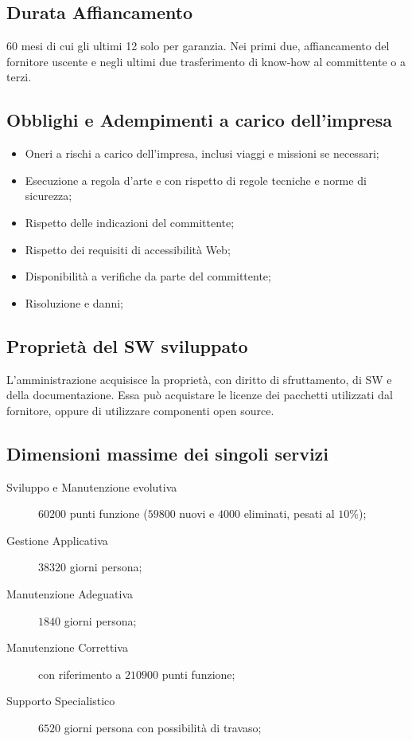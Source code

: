 \documentclass{article}
\begin{document}
\subsection{Durata Affiancamento}\label{sub:durata_affiancamento} %
60 mesi di cui gli ultimi 12 solo per garanzia.
Nei primi due, affiancamento del fornitore uscente e negli ultimi due trasferimento di know-how al committente o a terzi.
%
\subsection{Obblighi e Adempimenti a carico dell'impresa}\label{sub:obblighi_e_adempimenti_a_carico_dell_impresa} %
\begin{itemize}
    \item Oneri a rischi a carico dell'impresa, inclusi viaggi e missioni se necessari;
    \item Esecuzione a regola d'arte e con rispetto di regole tecniche e norme di sicurezza;
    \item Rispetto delle indicazioni del committente;
    \item Rispetto dei requisiti di accessibilità Web;
    \item Disponibilità a verifiche da parte del committente;
    \item Risoluzione e danni;
\end{itemize}
%
\subsection{Proprietà del SW sviluppato}\label{sub:propriet_del_sw_sviluppato} %
L'amministrazione acquisisce la proprietà, con diritto di sfruttamento, di SW e della documentazione.
Essa può acquistare le licenze dei pacchetti utilizzati dal fornitore, oppure di utilizzare componenti open source.
%
\subsection{Dimensioni massime dei singoli servizi}\label{sub:dimensioni_massime_dei_singoli_servizi} %
\begin{description}
    \item[Sviluppo e Manutenzione evolutiva] $60200$ punti funzione ($59800$ nuovi e $4000$ eliminati, pesati al $10\%$);
    \item[Gestione Applicativa] $38320$ giorni persona;
    \item[Manutenzione Adeguativa] $1840$ giorni persona;
    \item[Manutenzione Correttiva] con riferimento a $210900$ punti funzione;
    \item[Supporto Specialistico] $6520$ giorni persona con possibilità di travaso;
\end{description}
%
\end{document}
